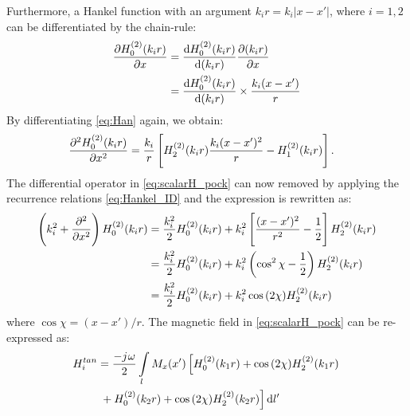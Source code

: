 %
Furthermore, a Hankel function with an argument $ k_i r = k_i|x - x'|$, where $i = 1,2$ can be differentiated by the chain-rule:
%
\begin{equation}
  \begin{split}
    \pdv{H_0^{(2)}(k_i r)}{x} &= \dv{H_0^{(2)}(k_i r)}{(k_i r)} \pdv{(k_i r)}{x} \\
    &= \dv{H_0^{(2)}(k_i r)}{(k_i r)} \times \frac{k_i (x - x')}{r}
  \end{split}
  \label{eq:Han}
\end{equation}
%
By differentiating \eqref{eq:Han} again, we obtain:
%
\begin{align}
  \pdv[2]{H_0^{(2)}(k_i r)}{x} &= \frac{k_i}{r} \left[H_2^{(2)}(k_i r) \frac{k_i (x - x')^2}{r} - H_1^{(2)}(k_i r) \right].
  \label{eq:difHan}
\end{align}
%
The differential operator in \eqref{eq:scalarH_pock} can now removed by applying the recurrence relations \eqref{eq:Hankel_ID} and the expression is rewritten as:
%
\begin{equation}
  \begin{split}
    \left(k_i^2 + \pdv[2]{}{x} \right) H_0^{(2)}(k_i r) &= \frac{k_i^2}{2} H_0^{(2)}(k_i r) + k_i^2 \left[ \frac{(x-x')^2}{r^2} - \frac{1}{2} \right] H_2^{(2)}(k_i r) \\
    &= \frac{k_i^2}{2} H_0^{(2)}(k_i r) + k_i^2 \left( \cos^2 \chi - \frac{1}{2} \right) H_2^{(2)}(k_i r) \\
    &= \frac{k_i^2}{2} H_0^{(2)}(k_i r) + k_i^2 \cos {(2\chi)} H_2^{(2)}(k_i r)
  \end{split}
  \label{eq:Hankel_final}
\end{equation}
%
where $\cos \chi = {(x-x')/r}$. The magnetic field in \eqref{eq:scalarH_pock} can be re-expressed as:
%
\begin{align}
  H_i^{tan} &=  \frac{-{j}\mkern1mu \omega}{2} \int\limits_{l} M_x(x') \left[ H_0^{(2)}(k_1 r) + \cos {(2 \chi)} H_2^{(2)}(k_1 r) \right. \notag\\
  & \left. {} + H_0^{(2)}(k_2 r) + \cos {(2\chi)} H_2^{(2)}(k_2 r)\right]\mathop{}\!\mathrm{d}{l'}
  \label{eq:H_final}
\end{align}
%
%
%
